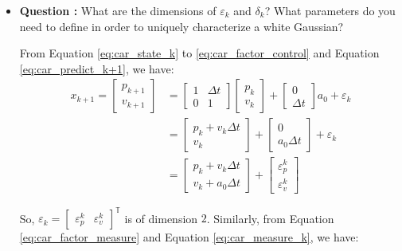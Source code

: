 \documentclass[11pt,a4paper]{article}
\begin{document}
\begin{itemize}
	\item \addtocounter{cnt_questions}{1} \textbf{Question :} What are the dimensions of $\varepsilon_{k}$ and $\delta_{k}$? What parameters do you need to define in order to uniquely characterize a white Gaussian?
		\par From Equation \ref{eq:car_state_k} to \ref{eq:car_factor_control} and Equation \ref{eq:car_predict_k+1}, we have:
			\begin{align}
				x_{k+1} = \begin{bmatrix} p_{k+1} \\ v_{k+1} \end{bmatrix} &= \begin{bmatrix} 1 & \Delta t \\ 0 & 1 \end{bmatrix} \begin{bmatrix} p_{k} \\ v_{k} \end{bmatrix} + \begin{bmatrix} 0 \\ \Delta t \end{bmatrix} a_{0} + \varepsilon_{k} \\
				&= \begin{bmatrix} p_{k} + v_{k}\Delta t \\ v_{k} \end{bmatrix} + \begin{bmatrix} 0 \\ a_{0}\Delta t \end{bmatrix} + \varepsilon_{k} \\
				&= \begin{bmatrix} p_{k} + v_{k}\Delta t \\ v_{k} + a_{0}\Delta t \end{bmatrix} + \begin{bmatrix} \varepsilon_{p}^{k} \\ \varepsilon_{v}^{k} \end{bmatrix}
			\end{align}
		\par So, $\varepsilon_{k} = \begin{bmatrix} \varepsilon_{p}^{k} & \varepsilon_{v}^{k} \end{bmatrix} ^ {\mathbb{T}}$ is of dimension $2$. Similarly, from Equation \ref{eq:car_factor_measure} and Equation \ref{eq:car_measure_k}, we have:
			\begin{align}

\end{align}
\end{itemize}
\end{document}
